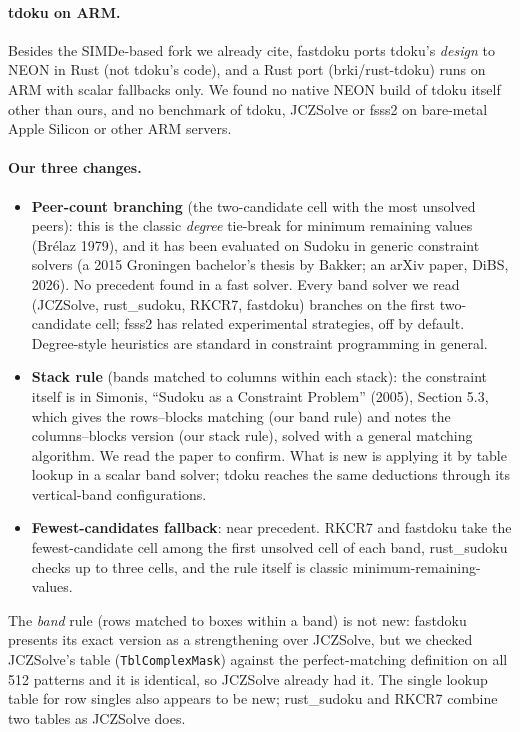 \documentclass[11pt]{article}
\begin{document}
\paragraph{tdoku on ARM.} Besides the SIMDe-based fork we already cite, fastdoku ports tdoku's \emph{design} to NEON
in Rust (not tdoku's code), and a Rust port (brki/rust-tdoku) runs on ARM with scalar fallbacks only. We found no
native NEON build of tdoku itself other than ours, and no benchmark of tdoku, JCZSolve or fsss2 on bare-metal Apple
Silicon or other ARM servers.

\paragraph{Our three changes.}
\begin{itemize}
\item \textbf{Peer-count branching} (the two-candidate cell with the most unsolved peers): this is the classic
  \emph{degree} tie-break for minimum remaining values (Br\'elaz 1979), and it has been evaluated on Sudoku in generic
  constraint solvers (a 2015 Groningen bachelor's thesis by Bakker; an arXiv paper, DiBS, 2026). No precedent found in
  a fast solver. Every band solver we read (JCZSolve, rust\_sudoku, RKCR7, fastdoku) branches on the first two-candidate
  cell; fsss2 has related experimental strategies, off by default. Degree-style heuristics are standard in constraint
  programming in general.
\item \textbf{Stack rule} (bands matched to columns within each stack): the constraint itself is in Simonis,
  ``Sudoku as a Constraint Problem'' (2005), Section 5.3, which gives the rows--blocks matching (our band rule) and
  notes the columns--blocks version (our stack rule), solved with a general matching algorithm. We read the paper to
  confirm. What is new is applying it by table lookup in a scalar band solver; tdoku reaches the same deductions
  through its vertical-band configurations.
\item \textbf{Fewest-candidates fallback}: near precedent. RKCR7 and fastdoku take the fewest-candidate cell among the
  first unsolved cell of each band, rust\_sudoku checks up to three cells, and the rule itself is classic
  minimum-remaining-values.
\end{itemize}
The \emph{band} rule (rows matched to boxes within a band) is not new: fastdoku presents its exact version as a
strengthening over JCZSolve, but we checked JCZSolve's table (\texttt{TblComplexMask}) against the perfect-matching
definition on all 512 patterns and it is identical, so JCZSolve already had it. The single lookup table for row singles
also appears to be new; rust\_sudoku and RKCR7 combine two tables as JCZSolve does.
\end{document}
